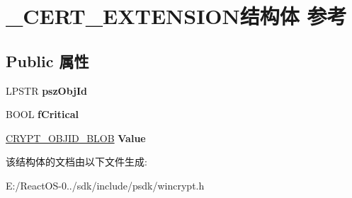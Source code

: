 \hypertarget{struct___c_e_r_t___e_x_t_e_n_s_i_o_n}{}\section{\+\_\+\+C\+E\+R\+T\+\_\+\+E\+X\+T\+E\+N\+S\+I\+O\+N结构体 参考}
\label{struct___c_e_r_t___e_x_t_e_n_s_i_o_n}
\subsection*{Public 属性}
\begin{DoxyCompactItemize}
\item 
\mbox{\label{struct___c_e_r_t___e_x_t_e_n_s_i_o_n_a730ce16e1d8a9e3e6d36f5fd2fc6422a}} 
L\+P\+S\+TR {\bfseries psz\+Obj\+Id}
\item 
\mbox{\label{struct___c_e_r_t___e_x_t_e_n_s_i_o_n_a34695adf93e28a72f8a86b630f09aded}} 
B\+O\+OL {\bfseries f\+Critical}
\item 
\mbox{\label{struct___c_e_r_t___e_x_t_e_n_s_i_o_n_a9c05f7278e345f0d43c4e0df295487e9}} 
\hyperlink{struct___c_r_y_p_t_o_a_p_i___b_l_o_b}{C\+R\+Y\+P\+T\+\_\+\+O\+B\+J\+I\+D\+\_\+\+B\+L\+OB} {\bfseries Value}
\end{DoxyCompactItemize}


该结构体的文档由以下文件生成\+:\begin{DoxyCompactItemize}
\item 
E\+:/\+React\+O\+S-\/0../sdk/include/psdk/wincrypt.\+h\end{DoxyCompactItemize}
